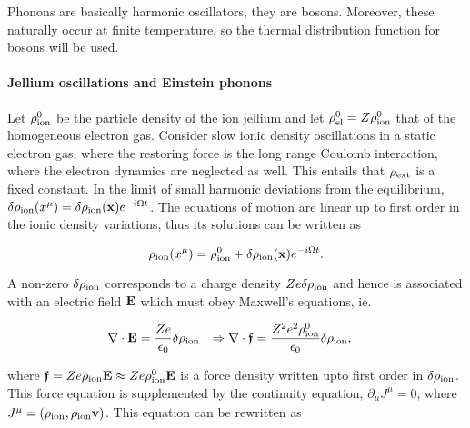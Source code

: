 \documentclass{homework}
\begin{document}
Phonons are basically harmonic oscillators, they are bosons. Moreover, these naturally occur at finite temperature, so the thermal distribution function for bosons will be used. \\

\paragraph{\textbf{Jellium oscillations and Einstein phonons}}

Let $\rho^0_{\textnormal{ion}}$ be the particle density of the ion jellium and let $\rho^0_{\textnormal{el}} = Z \rho^0_{\textnormal{ion}}$ that of the homogeneous electron gas. Consider slow ionic density oscillations in a static electron gas, where the restoring force is the long range Coulomb interaction, where the electron dynamics are neglected as well. This entails that $\rho_{\textnormal{ext}}$ is a fixed constant. In the limit of small harmonic deviations from the equilibrium, $\delta \rho_{\textnormal{ion}}(x^\mu) = \delta \rho_{\textnormal{ion}} ({\bf x}) e^{-i\Omega t}$. The equations of motion are linear up to first order in the ionic density variations, thus its solutions can be written as 

\begin{equation}
    \rho_{\textnormal{ion}}(x^\mu) = \rho^0_{\textnormal{ion}} + \delta \rho_{\textnormal{ion}} ({\bf x}) e^{-i\Omega t}.
\end{equation}

A non-zero $\delta \rho_{\textnormal{ion}}$ corresponds to a charge density $Z e \delta \rho_{\textnormal{ion}}$ and hence is associated with an electric field ${\bf E}$ which must obey Maxwell's equations, ie.

\begin{align}
    \nabla \cdot {\bf E} &= \frac{Ze}{\epsilon_0} \delta \rho_{\textnormal{ion}} & \Rightarrow  \nabla \cdot \bm{\mathfrak{f}} &= \frac{Z^2 e^2 \rho^0_{\textnormal{ion}} }{\epsilon_0} \delta \rho_{\textnormal{ion}},
\end{align}

where $\bm{\mathfrak{f}} = Z e \rho_{\textnormal{ion}} {\bf E} \approx Z e \rho^0_{\textnormal{ion}} {\bf E}$ is a force density written upto first order in $\delta \rho_{\textnormal{ion}}$. This force equation is supplemented by the continuity equation, $\partial_{\mu} J^\mu = 0$, where $J^\mu = (\rho_{\textnormal{ion}}, \rho_{\textnormal{ion}} {\bf v})$. This equation can be rewritten as 
\end{document}
